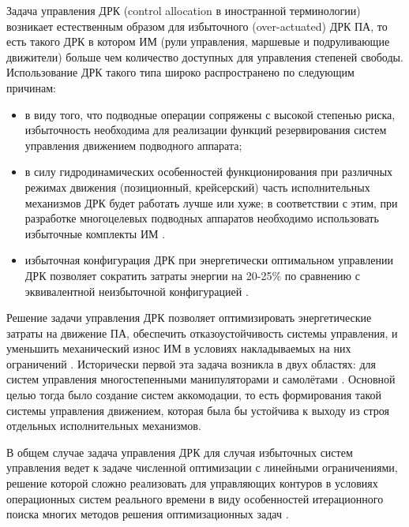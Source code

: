 {\actuality}
Задача управления ДРК (control allocation в иностранной терминологии) возникает естественным образом для избыточного (over-actuated) ДРК ПА, то есть такого ДРК в котором ИМ (рули управления, маршевые и подруливающие движители) больше чем количество доступных для управления степеней свободы. Использование ДРК такого типа широко распространено по следующим причинам:

\begin{itemize}
    \item в виду того, что подводные операции сопряжены с высокой степенью риска, избыточность необходима для реализации функций резервирования систем управления движением подводного аппарата;
    \item в силу гидродинамических особенностей функционирования при различных режимах движения (позиционный, крейсерский) часть исполнительных механизмов ДРК будет работать лучше или хуже; в соответствии с этим, при разработке многоцелевых подводных аппаратов необходимо использовать избыточные комплекты ИМ \cite{valasek2002design}.
    \item избыточная конфигурация ДРК при энергетически оптимальном управлении ДРК позволяет сократить затраты энергии на 20-25\% по сравнению с эквивалентной неизбыточной конфигурацией \cite{бриллиантов2005разработка}.
\end{itemize}

Решение задачи управления ДРК позволяет оптимизировать энергетические затраты на движение ПА, обеспечить отказоустойчивость системы управления, и уменьшить механический износ ИМ в условиях накладываемых на них ограничений \cite{enns1998control}.
Исторически первой эта задача возникла в двух областях: для систем управления многостепенными манипуляторами \cite{craig2009introduction} и самолётами \cite{bordignon1996constrained}. 
Основной целью тогда было создание систем аккомодации, то есть формирования такой системы управления движением, которая была бы устойчива к выходу из строя отдельных исполнительных механизмов.

В общем случае задача управления ДРК для случая избыточных систем управления ведет к задаче численной оптимизации с линейными ограничениями, решение которой сложно реализовать для управляющих контуров в условиях операционных систем реального времени в виду особенностей итерационного поиска многих методов решения оптимизационных задач \cite{burken2001two}.

